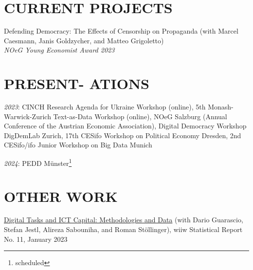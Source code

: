 \documentclass[margin, 12pt]{res} %
\begin{document}
\begin{resume}
		\section{CURRENT PROJECTS}
		
		Defending Democracy: The Effects of Censorship on Propaganda (with Marcel Caesmann, Janis Goldzycher, and Matteo Grigoletto) \\
		{\sl NOeG Young Economist Award 2023}
		
		
		
		
		\section{PRESENT- ATIONS}
		{\sl2023}: CINCH Research Agenda for Ukraine Workshop (online), 5th Monash-Warwick-Zurich Text-as-Data Workshop (online), NOeG Salzburg (Annual Conference of the Austrian Economic Association), Digital Democracy Workshop DigDemLab Zurich, 17th CESifo Workshop on Political Economy Dresden, 2nd CESifo/ifo Junior Workshop on Big Data Munich
		
		{\sl2024}: PEDD Münster\footnote{ scheduled}\addtocounter{footnote}{-1} %
		
		\section{OTHER WORK}
		
		
		\href{https://wiiw.ac.at/digital-tasks-and-ict-capital-methodologies-and-data-p-6429.html}{Digital Tasks and ICT Capital: Methodologies and Data} (with Dario Guarascio, Stefan Jestl, Alireza Sabouniha, and Roman Stöllinger), wiiw Statistical Report No. 11, January 2023
		

\end{resume}
\end{document}
